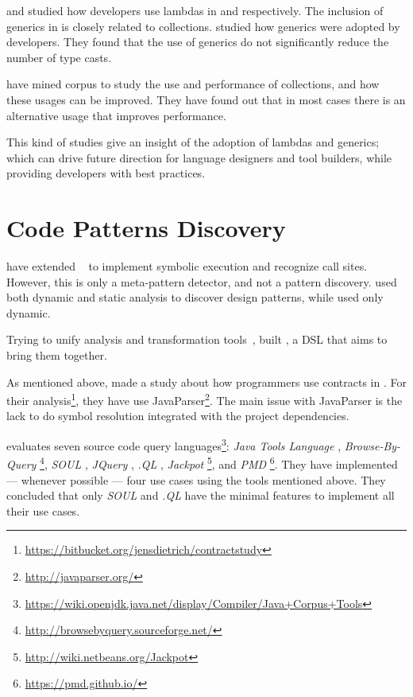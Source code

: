 \cite{mazinanianUnderstandingUseLambda2017} and \cite{uesbeckEmpiricalStudyImpact2016} studied how developers use lambdas in \java{} and \cpp{} respectively.
The inclusion of generics in \java{} is closely related to collections. 
\cite{parninJavaGenericsAdoption2011,parninAdoptionUseJava2013} studied how generics were adopted by \java{} developers.
They found that the use of generics do not significantly reduce the number of type casts.

\cite{costaEmpiricalStudyUsage2017} have mined \github{} corpus to study the use and performance of collections, and how these usages can be improved.
They have found out that in most cases there is an alternative usage that improves performance.

This kind of studies give an insight of the adoption of lambdas and generics; which can drive future direction for language designers and tool builders, while providing developers with best practices.

\section{Code Patterns Discovery}
\label{sec:lr:patterns}

\cite{posnettTHEXMiningMetapatterns2010} have extended \asm{}~\cite{brunetonASMCodeManipulation2002,kuleshovUsingASMFramework2007} to implement symbolic execution and recognize call sites.
However, this is only a meta-pattern detector, and not a pattern discovery.
\cite{huDynamicAnalysisDesign2008} used both dynamic and static analysis to discover design patterns, while \cite{arcelliDesignPatternDetection2008} used only dynamic.

Trying to unify analysis and transformation tools~\cite{vinjuHowMakeBridge2006}, \cite{klintRASCALDomainSpecific2009} built \rascal, a DSL that aims to bring them together.

As mentioned above, \cite{dietrichContractsWildStudy2017a} made a study about how programmers use contracts in \mavencentral{}.
For their analysis\footnote{\url{https://bitbucket.org/jensdietrich/contractstudy}}, they have use JavaParser\footnote{\url{http://javaparser.org/}}.
The main issue with JavaParser is the lack to do symbol resolution integrated with the project dependencies.

\cite{urmaProgrammingLanguageEvolution2012} evaluates seven source code query languages\footnote{\url{https://wiki.openjdk.java.net/display/Compiler/Java+Corpus+Tools}}:
\emph{Java Tools Language} \cite{cohenJTLJavaTools},
\emph{Browse-By-Query} \footnote{\url{http://browsebyquery.sourceforge.net/}},
\emph{SOUL} \cite{derooverSOULToolSuite2011},
\emph{JQuery} \cite{volderJqueryGenericCode2006a},
\emph{.QL} \cite{moorKeynoteAddressQL2007},
\emph{Jackpot} \footnote{\url{http://wiki.netbeans.org/Jackpot}}, and
\emph{PMD} \footnote{\url{https://pmd.github.io/}}.
They have implemented --- whenever possible --- four use cases using the tools mentioned above.
They concluded that only \emph{SOUL} and \emph{.QL} have the minimal features to implement all their use cases.

